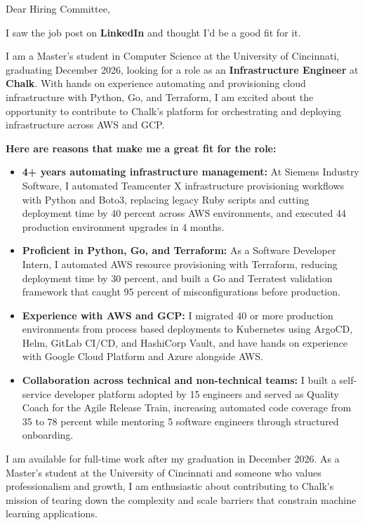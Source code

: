 \documentclass[11pt]{letter}
\date{}
\begin{document}
\begin{letter}{}

\opening{Dear Hiring Committee,}

I saw the job post on \textbf{LinkedIn} and thought I'd be a good fit for it.

I am a Master's student in Computer Science at the University of Cincinnati, graduating December 2026, looking for a role as an \textbf{Infrastructure Engineer} at \textbf{Chalk}. With hands on experience automating and provisioning cloud infrastructure with Python, Go, and Terraform, I am excited about the opportunity to contribute to Chalk's platform for orchestrating and deploying infrastructure across AWS and GCP.

\textbf{Here are reasons that make me a great fit for the role:}

\begin{itemize}[leftmargin=*, itemsep=0.45em]
    \item \textbf{4+ years automating infrastructure management:} At Siemens Industry Software, I automated Teamcenter X infrastructure provisioning workflows with Python and Boto3, replacing legacy Ruby scripts and cutting deployment time by 40 percent across AWS environments, and executed 44 production environment upgrades in 4 months.

    \item \textbf{Proficient in Python, Go, and Terraform:} As a Software Developer Intern, I automated AWS resource provisioning with Terraform, reducing deployment time by 30 percent, and built a Go and Terratest validation framework that caught 95 percent of misconfigurations before production.

    \item \textbf{Experience with AWS and GCP:} I migrated 40 or more production environments from process based deployments to Kubernetes using ArgoCD, Helm, GitLab CI/CD, and HashiCorp Vault, and have hands on experience with Google Cloud Platform and Azure alongside AWS.

    \item \textbf{Collaboration across technical and non-technical teams:} I built a self-service developer platform adopted by 15 engineers and served as Quality Coach for the Agile Release Train, increasing automated code coverage from 35 to 78 percent while mentoring 5 software engineers through structured onboarding.
\end{itemize}

I am available for full-time work after my graduation in December 2026. As a Master's student at the University of Cincinnati and someone who values professionalism and growth, I am enthusiastic about contributing to Chalk's mission of tearing down the complexity and scale barriers that constrain machine learning applications.


\end{letter}
\end{document}
